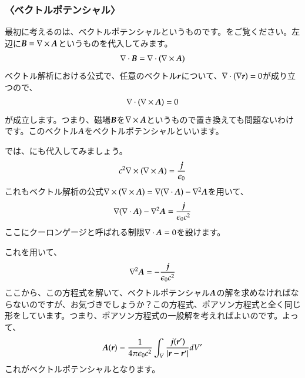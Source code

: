 \documentclass[10pt,b5paper,papersize,dvipdfmx]{jsbook}
\begin{document}
\subsubsection{〈ベクトルポテンシャル〉}
最初に考えるのは、ベクトルポテンシャルというものです。をご覧ください。左辺に$\vb*{B}=\nabla\times\vb*{A}$というものを代入してみます。
\begin{align}
  \nabla\cdot \vb*{B} = \nabla\cdot(\nabla\times\vb*{A})
\end{align}
ベクトル解析における公式で、任意のベクトル$\vb*{r}$について、$\nabla\cdot(\nabla\vb*{r})=0$が成り立つので、
\begin{align}
  \nabla\cdot(\nabla\times\vb*{A})=0
\end{align}
が成立します。つまり、磁場$\vb*{B}$を$\nabla\times\vb*{A}$というもので置き換えても問題ないわけです。このベクトル$\vb*{A}$をベクトルポテンシャルといいます。\par
では、にも代入してみましょう。
\begin{align}
  c^2 \nabla\times(\nabla\times\vb*{A}) = \frac{\vb*{j}}{\epsilon_0}
\end{align}
これもベクトル解析の公式$\nabla\times(\nabla\times\vb*{A})=\nabla(\nabla\cdot\vb*{A})-\nabla^2\vb*{A}$を用いて、
\begin{align}
  \nabla(\nabla\cdot\vb*{A})-\nabla^2\vb*{A} = \frac{\vb*{j}}{\epsilon_0 c^2}
\end{align}
ここにクーロンゲージと呼ばれる制限$\nabla\cdot\vb*{A} = 0$を設けます。\par
これを用いて、
\begin{align}
  \nabla^2\vb*{A} = -\frac{\vb*{j}}{\epsilon_0 c^2}
\end{align}
ここから、この方程式を解いて、ベクトルポテンシャル$\vb*{A}$の解を求めなければならないのですが、お気づきでしょうか？この方程式、ポアソン方程式と全く同じ形をしています。つまり、ポアソン方程式の一般解を考えればよいのです。よって、
\begin{align}
  \label{eq:vecP}
  \vb*{A}(\vb*{r})
  = \frac{1}{4\pi\epsilon_0 c^2} \int_V \frac{\vb*{j}(\vb*{r}')}{|\vb*{r}-\vb*{r}'|} dV'
\end{align}
これがベクトルポテンシャルとなります。
\end{document}
